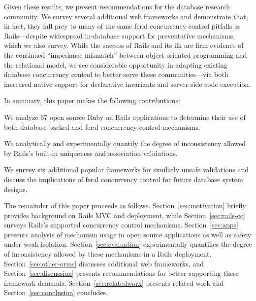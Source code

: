 Given these results, we present recommendations for the
database research community. We survey several additional web
frameworks and demonstrate that, in fact, they fall prey to many of
the same feral concurrency control pitfalls as Rails---despite
widespread in-database support for preventative mechanisms, which we
also survey. While the success of Rails and its ilk are firm evidence
of the continued ``impedance mismatch'' between object-oriented
programming and the relational model, we see considerable opportunity
in adapting existing database concurrency control to better serve
these communities---via both increased native support for declarative invariants
and server-side code execution.

In summary, this paper makes the following contributions:
\begin{myitemize}
\item We analyze 67 open source Ruby on Rails applications to
  determine their use of both database-backed and feral concurrency
  control mechanisms.

\item We analytically and experimentally quantify the degree of
  inconsistency allowed by Rails's built-in uniqueness and association
  validations.

\item We survey six additional popular frameworks for similarly unsafe
  validations and discuss the implications of feral concurrency
  control for future database system designs.
\end{myitemize}

The remainder of this paper proceeds as
follows. Section~\ref{sec:motivation} briefly provides background on
Rails MVC and deployment, while Section~\ref{sec:rails-cc} surveys
Rails's supported concurrency control
mechanisms. Section~\ref{sec:apps} presents analysis of mechanism
usage in open source applications as well as safety under weak
isolation.  Section~\ref{sec:evaluation} experimentally quantifies the
degree of inconsistency allowed by these mechanisms in a Rails
deployment. Section~\ref{sec:other-orms} discusses additional web
frameworks, and Section~\ref{sec:discussion} presents recommendations
for better supporting these framework demands. Section~\ref{sec:relatedwork}
presents related work and Section~\ref{sec:conclusion} concludes.
